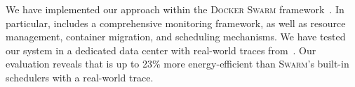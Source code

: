 We have implemented our approach within the \textsc{Docker Swarm} framework~\cite{swarm}.
In particular, \GP includes a comprehensive monitoring framework, as well as resource management, container migration, and scheduling mechanisms.
We have tested our system in a dedicated data center with real-world traces from~\cite{DBLP:conf/eurosys/VermaPKOTW15}.
Our evaluation reveals that \GP is up to 23\% more energy-efficient than \textsc{Swarm}'s built-in schedulers with a real-world trace.
